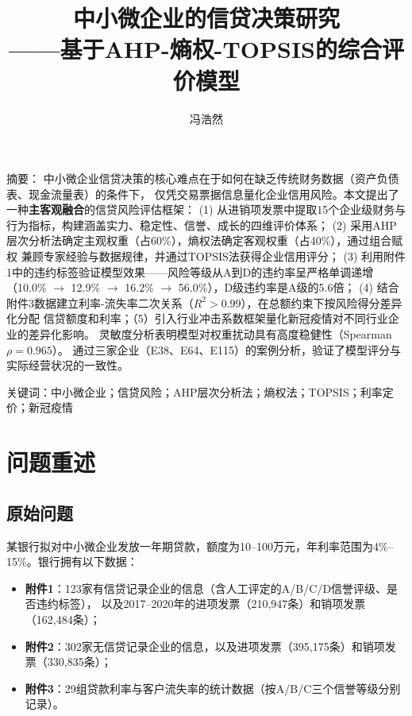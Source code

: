 \documentclass[12pt,a4paper]{ctexart}
\title{\vspace{-2cm}\heiti\zihao{2} 中小微企业的信贷决策研究\\
\vspace{0.3cm}\normalfont\zihao{4} ——基于AHP-熵权-TOPSIS的综合评价模型}
\author{\zihao{4} 冯浩然}
\date{}
\begin{document}
\maketitle

\begin{center}
\vspace{0.5cm}
{\heiti 摘要：}
中小微企业信贷决策的核心难点在于如何在缺乏传统财务数据（资产负债表、现金流量表）的条件下，
仅凭交易票据信息量化企业信用风险。本文提出了一种\textbf{主客观融合}的信贷风险评估框架：
(1) 从进销项发票中提取15个企业级财务与行为指标，构建涵盖实力、稳定性、信誉、成长的四维评价体系；
(2) 采用AHP层次分析法确定主观权重（占60\%），熵权法确定客观权重（占40\%），通过组合赋权
兼顾专家经验与数据规律，并通过TOPSIS法获得企业信用评分；
(3) 利用附件1中的违约标签验证模型效果——风险等级从A到D的违约率呈严格单调递增（10.0\% $\to$
12.9\% $\to$ 16.2\% $\to$ 56.0\%），D级违约率是A级的5.6倍；
(4) 结合附件3数据建立利率-流失率二次关系（$R^2>0.99$），在总额约束下按风险得分差异化分配
信贷额度和利率；（5）引入行业冲击系数框架量化新冠疫情对不同行业企业的差异化影响。
灵敏度分析表明模型对权重扰动具有高度稳健性（Spearman $\rho=0.965$）。
通过三家企业（E38、E64、E115）的案例分析，验证了模型评分与实际经营状况的一致性。

\vspace{0.3cm}
{\heiti 关键词：}中小微企业；信贷风险；AHP层次分析法；熵权法；TOPSIS；利率定价；新冠疫情
\end{center}

\newpage
\tableofcontents
\newpage

\section{问题重述}

\subsection{原始问题}

某银行拟对中小微企业发放一年期贷款，额度为10--100万元，年利率范围为4\%--15\%。银行拥有以下数据：
\begin{itemize}
    \item \textbf{附件1}：123家有信贷记录企业的信息（含人工评定的A/B/C/D信誉评级、是否违约标签），
          以及2017--2020年的进项发票（210,947条）和销项发票（162,484条）；
    \item \textbf{附件2}：302家无信贷记录企业的信息，以及进项发票（395,175条）和销项发票（330,835条）；
    \item \textbf{附件3}：29组贷款利率与客户流失率的统计数据（按A/B/C三个信誉等级分别记录）。
\end{itemize}
\end{document}
